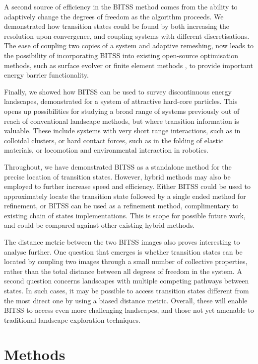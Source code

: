 \documentclass[twocolumn,10pt]{revtex4}
\begin{document}
A second source of efficiency in the BITSS method comes from the ability to adaptively change the degrees of freedom as the algorithm proceeds.
We demonstrated how transition states could be found by both increasing the resolution upon convergence, and coupling systems with different discretisations.
The ease of coupling two copies of a system and adaptive remeshing, now leads to the possibility of incorporating BITSS into existing open-source optimisation methods, such as surface evolver \cite{Brakke1992} or finite element methods \cite{Kolev2021}, to provide important energy barrier functionality.

Finally, we showed how BITSS can be used to survey discontinuous energy landscapes, demonstrated for a system of attractive hard-core particles.
This opens up possibilities for studying a broad range of systems previously out of reach of conventional landscape methods, but where transition information is valuable.
These include systems with very short range interactions, such as in colloidal clusters, or hard contact forces, such as in the folding of elastic materials, or locomotion and environmental interaction in robotics.

Throughout, we have demonstrated BITSS as a standalone method for the precise location of transition states.
However, hybrid methods may also be employed to further increase speed and efficiency.
Either BITSS could be used to approximately locate the transition state followed by a single ended method for refinement, or BITSS can be used as a refinement method, complimentary to existing chain of states implementations.
This is scope for possible future work, and could be compared against other existing hybrid methods.

The distance metric between the two BITSS images also proves interesting to analyse further.
One question that emerges is whether transition states can be located by coupling two images through a small number of collective properties, rather than the total distance between all degrees of freedom in the system.
A second question concerns landscapes with multiple competing pathways between states.
In such cases, it may be possible to access transition states different from the most direct one by using a biased distance metric.
Overall, these will enable BITSS to access even more challenging landscapes, and those not yet amenable to traditional landscape exploration techniques.


\appendix
\section*{Methods}
\end{document}
